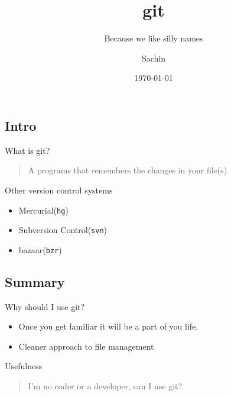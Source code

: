 \documentclass[10pt]{beamer}
\subtitle{Because we like silly names}
\institute{Red Hat}
\author{Sachin}
\date{\today}
\title{git}
\begin{document}
\maketitle


\subsection{Intro}
\label{sec:orgf9854fc}
\begin{frame}[label={sec:orgb44c75d}]{What is git?}
\begin{quote}
A programs that remembers the changes in your file(s)
\end{quote}
\end{frame}

\begin{frame}[fragile,label={sec:orgc6c636a}]{Other version control systems}
 \begin{itemize}
\item Mercurial(\texttt{hg})
\item Subversion Control(\texttt{svn})
\item bazaar(\texttt{bzr})
\end{itemize}
\end{frame}

\subsection{Summary}
\label{sec:orgbecbd53}
\begin{frame}[label={sec:org5785b28}]{Why should I use git?}
\begin{itemize}
\item Once you get familiar it will be a part of you life.
\item Cleaner approach to file management
\end{itemize}
\end{frame}

\begin{frame}[label={sec:orgf326437}]{Usefulness}
\begin{quote}
I'm no coder or a developer, can I use \alert{git}?
\end{quote}
\end{frame}
\end{document}
